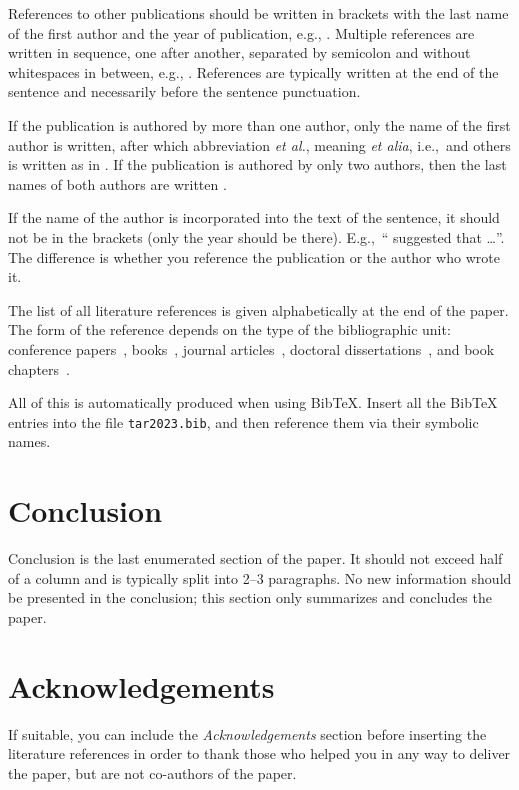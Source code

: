 \documentclass[10pt, a4paper]{article}
\begin{document}
References to other publications should be written in brackets with the last name of the first author and the year of publication, e.g., \citep{chomsky-73}.
Multiple references are written in sequence, one after another, separated by semicolon and without whitespaces in between, e.g., \citep{chomsky-73,chave-64,feigl-58}.
References are typically written at the end of the sentence and necessarily before the sentence punctuation.

If the publication is authored by more than one author, only the name of the first author is written, after which abbreviation \emph{et al.}, meaning \emph{et alia}, i.e.,~and others is written as in \citep{johnson-etc}.
If the publication is authored by only two authors, then the last names of both authors are written \citep{johnson-howells}.

If the name of the author is incorporated into the text of the sentence, it should not be in the brackets (only the year should be there).
E.g.,~``\citet{chomsky-73} suggested that \dots''.
The difference is whether you reference the publication or the author who wrote it.

The list of all literature references is given alphabetically at the end of the paper.
The form of the reference depends on the type of the bibliographic unit: conference papers~\citep{chave-64}, books~\citep{butcher-81}, journal articles~\citep{howells-51}, doctoral dissertations~\citep{croft-78}, and book chapters~\citep{feigl-58}.

All of this is automatically produced when using BibTeX. Insert all the BibTeX entries into the file \texttt{tar2023.bib}, and then reference them via their symbolic names.

\section{Conclusion}

Conclusion is the last enumerated section of the paper.
It should not exceed half of a column and is typically split into 2--3 paragraphs.
No new information should be presented in the conclusion;
this section only summarizes and concludes the paper.

\section*{Acknowledgements}

If suitable, you can include the \textit{Acknowledgements} section before inserting the literature references  in order to thank those who helped you in any way to deliver the paper, but are not co-authors of the paper.


 
\end{document}
